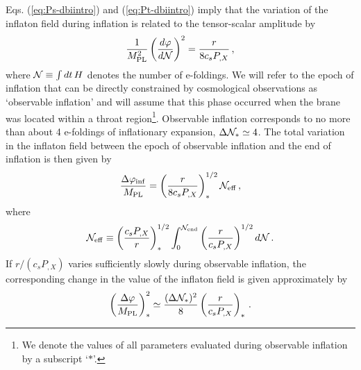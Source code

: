 Eqs. (\ref{eq:Ps-dbiintro}) and (\ref{eq:Pt-dbiintro}) imply 
that the variation of the inflaton field during inflation  
is related to the tensor-scalar amplitude by \cite{lyth,bmpaper}
% 
\begin{equation}
\label{eq:genlyth-dbiintro}
\frac{1}{M_{\mathrm{PL}}^2}
\left( \frac{d \varphi}{d \cal{N}} \right)^2 = \frac{r}{8 c_s P_{,X}} \,,
\end{equation}
% 
where ${\cal{N}} \equiv \int dt \, H$ denotes the number of e-foldings.
We will refer to the epoch of inflation that can be directly 
constrained by cosmological observations as 
`observable inflation' and will assume that this phase 
occurred when the brane was located within a 
throat region\footnote{We denote the values of all parameters 
evaluated during observable inflation by a subscript 
`$*$'.}. Observable inflation corresponds to no more than about 4 e-foldings  
of inflationary expansion, $\Delta {\cal{N}}_* \simeq 4$. 
The total variation in the inflaton field between the epoch of observable 
inflation and the end of inflation is then given by
% 
\begin{equation}
\label{eq:totalfield-dbiintro}
\frac{\Delta \varphi_{\rm inf}}{M_{\mathrm{PL}}} = 
\left( \frac{r}{8c_sP_{,X}} \right)_*^{1/2} {\cal{N}}_{\rm eff} \,,
\end{equation}
% 
where
% 
\begin{equation}
\label{eq:Neff-dbiintro}
{\cal{N}}_{\rm eff} \equiv \left( \frac{c_sP_{,X}}{r}\right)_*^{1/2}
\int_0^{{\cal{N}}_{\rm end}}  
\left( \frac{r}{c_sP_{,X}} \right)^{1/2} d {\cal{N}} \,.
\end{equation}
% 
If $r/(c_s P_{,X})$ varies 
sufficiently slowly during observable inflation, 
the corresponding change in the value of the inflaton  
field is given approximately by \cite{lyth,bmpaper}
% 
\begin{equation}
\label{eq:approxlyth-dbiintro}
\left( \frac{\Delta \varphi}{M_{\mathrm{PL}}} \right)_*^2 \simeq 
\frac{(\Delta {\cal{N}}_*)^2}{8} \left( \frac{r}{c_sP_{,X}} \right)_* \,.
\end{equation}
% 

